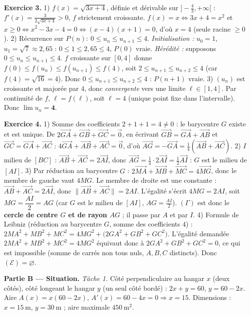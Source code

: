 \noindent\textbf{Exercice 3.}
1) $f(x)=\sqrt{3x+4}$, définie et dérivable sur $]-\frac43,+\infty[$ : $f'(x)=\frac{3}{2\sqrt{3x+4}}>0$, $f$ strictement croissante.
$f(x)=x\iff 3x+4=x^2$ et $x\ge0\iff x^2-3x-4=0\iff(x-4)(x+1)=0$, d'où $x=4$ (seule racine $\ge0$).
2) Récurrence sur $P(n):\ 0\le u_n\le u_{n+1}\le4$.
\emph{Initialisation :} $u_0=1$, $u_1=\sqrt{7}\approx2{,}65$ : $0\le1\le2{,}65\le4$, $P(0)$ vraie.
\emph{Hérédité :} supposons $0\le u_n\le u_{n+1}\le4$. $f$ croissante sur $[0,4]$ donne
$f(0)\le f(u_n)\le f(u_{n+1})\le f(4)$, soit $2\le u_{n+1}\le u_{n+2}\le4$ (car $f(4)=\sqrt{16}=4$).
Donc $0\le u_{n+1}\le u_{n+2}\le4$ : $P(n+1)$ vraie.
3) $(u_n)$ est croissante et majorée par $4$, donc \emph{convergente} vers une limite $\ell\in[1,4]$.
Par continuité de $f$, $\ell=f(\ell)$, soit $\ell=4$ (unique point fixe dans l'intervalle). Donc $\displaystyle\lim u_n=\mathbf4$.

\noindent\textbf{Exercice 4.}
1) Somme des coefficients $2+1+1=4\neq0$ : le barycentre $G$ existe et est unique. De
$2\overrightarrow{GA}+\overrightarrow{GB}+\overrightarrow{GC}=\vec0$, en écrivant $\overrightarrow{GB}=\overrightarrow{GA}+\overrightarrow{AB}$ et $\overrightarrow{GC}=\overrightarrow{GA}+\overrightarrow{AC}$ :
$4\overrightarrow{GA}+\overrightarrow{AB}+\overrightarrow{AC}=\vec0$, d'où $\overrightarrow{AG}=-\overrightarrow{GA}=\frac14(\overrightarrow{AB}+\overrightarrow{AC})$.
2) $I$ milieu de $[BC]$ : $\overrightarrow{AB}+\overrightarrow{AC}=2\overrightarrow{AI}$, donc $\overrightarrow{AG}=\frac14\cdot2\overrightarrow{AI}=\frac12\overrightarrow{AI}$ : $G$ est le milieu de $[AI]$.
3) Par réduction au barycentre $G$ : $2\overrightarrow{MA}+\overrightarrow{MB}+\overrightarrow{MC}=4\overrightarrow{MG}$, donc le membre de gauche vaut $4MG$.
Le membre de droite est une constante : $\overrightarrow{AB}+\overrightarrow{AC}=2\overrightarrow{AI}$, donc $\|\overrightarrow{AB}+\overrightarrow{AC}\|=2AI$.
L'égalité s'écrit $4MG=2AI$, soit $MG=\dfrac{AI}{2}=AG$ (car $G$ est le milieu de $[AI]$, $AG=\frac{AI}{2}$).
$(\Gamma)$ est donc le \textbf{cercle de centre $G$ et de rayon $AG$} ; il passe par $A$ et par $I$.
4) Formule de Leibniz (réduction au barycentre $G$, somme des coefficients $4$) :
$2MA^2+MB^2+MC^2=4MG^2+\big(2GA^2+GB^2+GC^2\big)$.
L'égalité demandée $2MA^2+MB^2+MC^2=4MG^2$ équivaut donc à $2GA^2+GB^2+GC^2=0$, ce qui est
impossible (somme de carrés non tous nuls, $A,B,C$ distincts). Donc $(\mathcal E)=\varnothing$.

\smallskip
\noindent\textbf{Partie B — Situation.}
\emph{Tâche 1.} Côté perpendiculaire au hangar $x$ (deux côtés), côté longeant le hangar $y$
(un seul côté bordé) : $2x+y=60$, $y=60-2x$. Aire $A(x)=x(60-2x)$, $A'(x)=60-4x=0\Rightarrow x=15$.
Dimensions : $x=\SI{15}{\metre}$, $y=\SI{30}{\metre}$ ; aire maximale $\SI{450}{\metre\squared}$.

